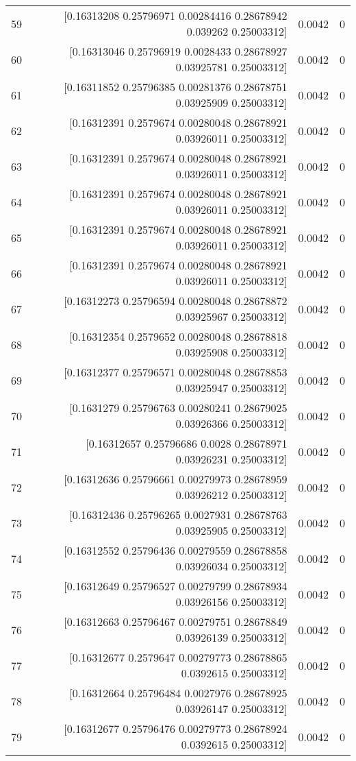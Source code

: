 \begin{longtable}{lrrr}
59 & [0.16313208 0.25796971 0.00284416 0.28678942 0.039262   0.25003312] & 0.0042 & 0 \\
60 & [0.16313046 0.25796919 0.0028433  0.28678927 0.03925781 0.25003312] & 0.0042 & 0 \\
61 & [0.16311852 0.25796385 0.00281376 0.28678751 0.03925909 0.25003312] & 0.0042 & 0 \\
62 & [0.16312391 0.2579674  0.00280048 0.28678921 0.03926011 0.25003312] & 0.0042 & 0 \\
63 & [0.16312391 0.2579674  0.00280048 0.28678921 0.03926011 0.25003312] & 0.0042 & 0 \\
64 & [0.16312391 0.2579674  0.00280048 0.28678921 0.03926011 0.25003312] & 0.0042 & 0 \\
65 & [0.16312391 0.2579674  0.00280048 0.28678921 0.03926011 0.25003312] & 0.0042 & 0 \\
66 & [0.16312391 0.2579674  0.00280048 0.28678921 0.03926011 0.25003312] & 0.0042 & 0 \\
67 & [0.16312273 0.25796594 0.00280048 0.28678872 0.03925967 0.25003312] & 0.0042 & 0 \\
68 & [0.16312354 0.2579652  0.00280048 0.28678818 0.03925908 0.25003312] & 0.0042 & 0 \\
69 & [0.16312377 0.25796571 0.00280048 0.28678853 0.03925947 0.25003312] & 0.0042 & 0 \\
70 & [0.1631279  0.25796763 0.00280241 0.28679025 0.03926366 0.25003312] & 0.0042 & 0 \\
71 & [0.16312657 0.25796686 0.0028     0.28678971 0.03926231 0.25003312] & 0.0042 & 0 \\
72 & [0.16312636 0.25796661 0.00279973 0.28678959 0.03926212 0.25003312] & 0.0042 & 0 \\
73 & [0.16312436 0.25796265 0.0027931  0.28678763 0.03925905 0.25003312] & 0.0042 & 0 \\
74 & [0.16312552 0.25796436 0.00279559 0.28678858 0.03926034 0.25003312] & 0.0042 & 0 \\
75 & [0.16312649 0.25796527 0.00279799 0.28678934 0.03926156 0.25003312] & 0.0042 & 0 \\
76 & [0.16312663 0.25796467 0.00279751 0.28678849 0.03926139 0.25003312] & 0.0042 & 0 \\
77 & [0.16312677 0.2579647  0.00279773 0.28678865 0.0392615  0.25003312] & 0.0042 & 0 \\
78 & [0.16312664 0.25796484 0.0027976  0.28678925 0.03926147 0.25003312] & 0.0042 & 0 \\
79 & [0.16312677 0.25796476 0.00279773 0.28678924 0.0392615  0.25003312] & 0.0042 & 0 \\

\end{longtable}
